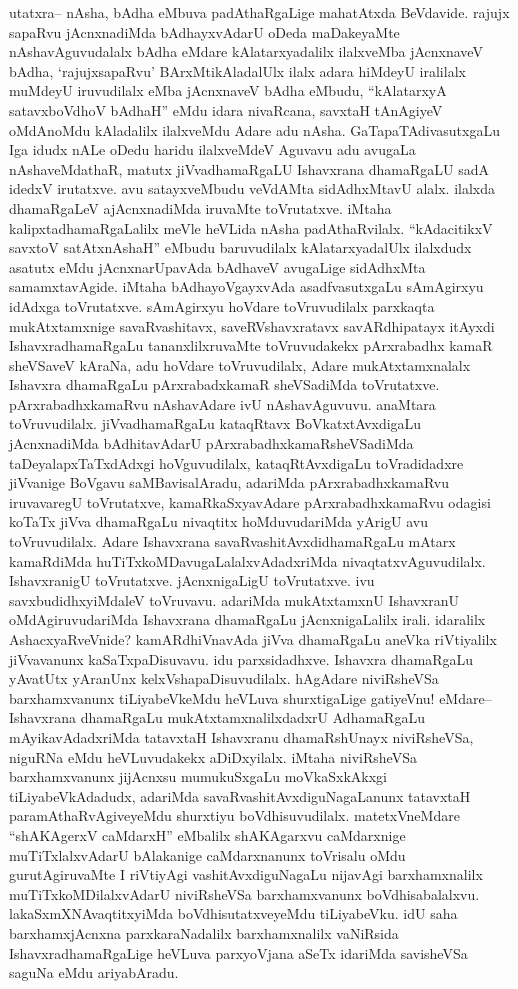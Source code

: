 \begin{artha}
utatxra-- nAsha, bAdha eMbuva padAthaRgaLige mahatAtxda BeVdavide. rajujx sapaRvu jAcnxnadiMda bAdhayxvAdarU oDeda maDakeyaMte nAshavAguvudalalx bAdha eMdare kAlatarxyadalilx ilalxveMba jAcnxnaveV bAdha, `rajujxsapaRvu' BArxMtikAladalUlx ilalx adara hiMdeyU iralilalx muMdeyU iruvudilalx eMba jAcnxnaveV bAdha eMbudu, ``kAlatarxyA satavxboVdhoV bAdhaH'' eMdu idara nivaRcana, savxtaH tAnAgiyeV oMdAnoMdu kAladalilx ilalxveMdu Adare adu nAsha. GaTapaTAdivasutxgaLu Iga idudx nALe oDedu haridu ilalxveMdeV Aguvavu adu avugaLa nAshaveMdathaR, matutx jiVvadhamaRgaLU Ishavxrana dhamaRgaLU sadA idedxV irutatxve. avu satayxveMbudu veVdAMta sidAdhxMtavU alalx. ilalxda dhamaRgaLeV ajAcnxnadiMda iruvaMte toVrutatxve. iMtaha kalipxtadhamaRgaLalilx meVle heVLida nAsha padAthaRvilalx. ``kAdacitikxV savxtoV satAtxnAshaH'' eMbudu baruvudilalx kAlatarxyadalUlx ilalxdudx asatutx eMdu jAcnxnarUpavAda bAdhaveV avugaLige sidAdhxMta samamxtavAgide. iMtaha bAdhayoVgayxvAda asadfvasutxgaLu sAmAgirxyu idAdxga toVrutatxve. sAmAgirxyu hoVdare toVruvudilalx parxkaqta mukAtxtamxnige savaRvashitavx, saveRVshavxratavx savARdhipatayx itAyxdi IshavxradhamaRgaLu tananxlilxruvaMte toVruvudakekx pArxrabadhx kamaR sheVSaveV kAraNa, adu hoVdare toVruvudilalx, Adare mukAtxtamxnalalx Ishavxra dhamaRgaLu pArxrabadxkamaR sheVSadiMda toVrutatxve. pArxrabadhxkamaRvu nAshavAdare ivU nAshavAguvuvu. anaMtara toVruvudilalx. jiVvadhamaRgaLu kataqRtavx BoVkatxtAvxdigaLu jAcnxnadiMda bAdhitavAdarU pArxrabadhxkamaRsheVSadiMda taDeyalapxTaTxdAdxgi hoVguvudilalx, kataqRtAvxdigaLu toVradidadxre jiVvanige BoVgavu saMBavisalAradu, adariMda pArxrabadhxkamaRvu iruvavaregU toVrutatxve, kamaRkaSxyavAdare pArxrabadhxkamaRvu odagisi koTaTx jiVva dhamaRgaLu nivaqtitx hoMduvudariMda yArigU avu toVruvudilalx. Adare Ishavxrana savaRvashitAvxdidhamaRgaLu mAtarx kamaRdiMda huTiTxkoMDavugaLalalxvAdadxriMda nivaqtatxvAguvudilalx. IshavxranigU toVrutatxve. jAcnxnigaLigU toVrutatxve. ivu savxbudidhxyiMdaleV toVruvavu. adariMda mukAtxtamxnU IshavxranU oMdAgiruvudariMda Ishavxrana dhamaRgaLu jAcnxnigaLalilx irali. idaralilx AshacxyaRveVnide? kamARdhiVnavAda jiVva dhamaRgaLu aneVka riVtiyalilx jiVvavanunx kaSaTxpaDisuvavu. idu parxsidadhxve. Ishavxra dhamaRgaLu yAvatUtx yAranUnx kelxVshapaDisuvudilalx. hAgAdare niviRsheVSa barxhamxvanunx tiLiyabeVkeMdu heVLuva shurxtigaLige gatiyeVnu! eMdare-- Ishavxrana dhamaRgaLu mukAtxtamxnalilxdadxrU AdhamaRgaLu mAyikavAdadxriMda tatavxtaH Ishavxranu dhamaRshUnayx niviRsheVSa, niguRNa eMdu heVLuvudakekx aDiDxyilalx. iMtaha niviRsheVSa barxhamxvanunx jijAcnxsu mumukuSxgaLu moVkaSxkAkxgi tiLiyabeVkAdadudx, adariMda savaRvashitAvxdiguNagaLanunx tatavxtaH paramAthaRvAgiveyeMdu shurxtiyu boVdhisuvudilalx. matetxVneMdare ``shAKAgerxV caMdarxH'' eMbalilx shAKAgarxvu caMdarxnige muTiTxlalxvAdarU bAlakanige caMdarxnanunx toVrisalu oMdu gurutAgiruvaMte I riVtiyAgi vashitAvxdiguNagaLu nijavAgi barxhamxnalilx muTiTxkoMDilalxvAdarU niviRsheVSa barxhamxvanunx boVdhisabalalxvu. lakaSxmXNAvaqtitxyiMda boVdhisutatxveyeMdu tiLiyabeVku. idU saha barxhamxjAcnxna parxkaraNadalilx barxhamxnalilx vaNiRsida IshavxradhamaRgaLige heVLuva parxyoVjana aSeTx idariMda savisheVSa saguNa eMdu ariyabAradu.


\end{artha}
